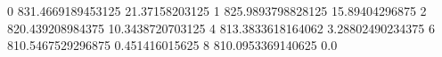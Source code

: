 0 831.4669189453125 21.37158203125
1 825.9893798828125 15.89404296875
2 820.439208984375 10.3438720703125
4 813.3833618164062 3.28802490234375
6 810.5467529296875 0.451416015625
8 810.0953369140625 0.0
